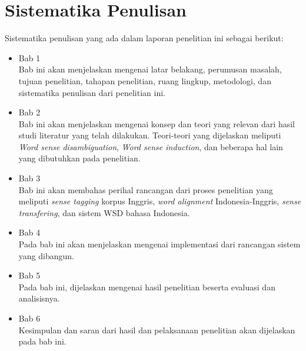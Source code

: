 \section{Sistematika Penulisan}
Sistematika penulisan yang ada dalam laporan penelitian ini sebagai berikut:
\begin{itemize}
	
	\item Bab 1 \babSatu \\
	Bab ini akan menjelaskan mengenai latar belakang, perumusan masalah, tujuan penelitian, tahapan penelitian, ruang lingkup, metodologi, dan sistematika penulisan dari penelitian ini.
	
	\item Bab 2 \babDua \\
	Bab ini akan menjelaskan mengenai konsep dan teori yang relevan dari hasil studi literatur yang telah dilakukan. Teori-teori yang dijelaskan meliputi \textit{Word sense disambiguation}, \textit{Word sense induction}, dan beberapa hal lain yang dibutuhkan pada penelitian.
	
	\item Bab 3 \babTiga \\
	Bab ini akan membahas perihal rancangan dari proses penelitian yang meliputi \textit{sense tagging} korpus Inggris, \textit{word alignment} Indonesia-Inggris, \textit{sense transfering}, dan sistem WSD bahasa Indonesia.
	
	\item Bab 4 \babEmpat \\
	Pada bab ini akan menjelaskan mengenai implementasi dari rancangan sistem yang dibangun.
	
	\item Bab 5 \babLima \\
	Pada bab ini, dijelaskan mengenai hasil penelitian beserta evaluasi dan analisisnya. 
	
	\item Bab 6 \babEnam \\
	Kesimpulan dan saran dari hasil dan pelaksanaan penelitian akan dijelaskan pada bab ini.
	
\end{itemize}